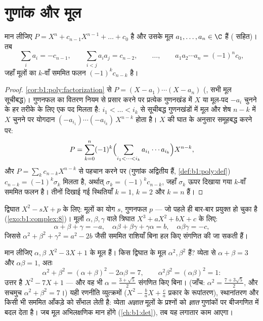 \section{गुणांक और मूल}

\begin{theorem}[व्येता के सूत्र]\label{thm:b1:poly:vieta}
मान लीजिए $P = X^n + c_{n-1} X^{n-1} + \dots + c_0$  है और उसके मूल
$a_1, \dots, a_n \in \C$ हैं ( सहित)। तब
\[
\sum_i a_i = -c_{n-1},
\qquad
\sum_{i < j} a_i a_j = c_{n-2},
\qquad \dots, \qquad
a_1 a_2 \cdots a_n = (-1)^n c_0 ,
\]
जहाँ मूलों का $k$-वाँ सममित फलन $(-1)^k c_{n-k}$ है।
\end{theorem}

\begin{proof}
\cref{cor:b1:poly:factorization} से $P = (X - a_1)\cdots(X - a_n)$
(, सभी मूल सूचीबद्ध)। गुणनफल का वितरण नियम से प्रसार करने पर
प्रत्येक गुणनखंड में $X$ या मूल-पद $-a_i$ चुनने के हर तरीके के लिए एक पद
मिलता है: $i_1 < \dots < i_k$ से सूचीबद्ध गुणनखंडों में मूल और शेष $n - k$
में $X$ चुनने पर योगदान $(-a_{i_1})\cdots(-a_{i_k})\,X^{n-k}$ होता है। $X$
की घात के अनुसार समूहबद्ध करने पर:
\[
P = \sum_{k=0}^{n} (-1)^k
\Bigl(\sum_{i_1 < \dots < i_k} a_{i_1}\cdots a_{i_k}\Bigr)
X^{n-k} ,
\]
और $P = \sum_k c_{n-k}X^{n-k}$ से पहचान करने पर (गुणांक अद्वितीय हैं,
\cref{def:b1:poly:def}) $c_{n-k} = (-1)^k \sigma_k$ मिलता है, अर्थात्
$\sigma_k = (-1)^kc_{n-k}$, जहाँ $\sigma_k$ ऊपर दिखाया गया $k$-वाँ सममित फलन
है। तीनों दिखाई गई स्थितियाँ $k = 1$, $k = 2$ और $k = n$ हैं।
\end{proof}

\begin{example}\label{ex:b1:poly:vieta}
द्विघात $X^2 - sX + p$ के लिए: मूलों का योग $s$, गुणनफल $p$ --- जो पहले ही
बार-बार प्रयुक्त हो चुका है (\cref{exo:b1:complex:8})। मूलों $\alpha, \beta,
\gamma$ वाले  त्रिघात $X^3 + aX^2 + bX + c$ के लिए:
\[
\alpha + \beta + \gamma = -a,
\quad
\alpha\beta + \beta\gamma + \gamma\alpha = b,
\quad
\alpha\beta\gamma = -c ,
\]
जिससे $\alpha^2 + \beta^2 + \gamma^2 = a^2 - 2b$ जैसी सममित राशियाँ बिना हल
किए संगणित की जा सकती हैं।
\end{example}

\begin{example}\label{ex:b1:poly:transformroots}
मान लीजिए $\alpha, \beta$ $X^2 - 3X + 1$ के मूल हैं। किस  द्विघात
के मूल $\alpha^2, \beta^2$ हैं? व्येता से $\alpha + \beta = 3$ और
$\alpha\beta = 1$, अतः
\[
\alpha^2 + \beta^2 = (\alpha+\beta)^2 - 2\alpha\beta = 7,
\qquad
\alpha^2\beta^2 = (\alpha\beta)^2 = 1 :
\]
उत्तर है $X^2 - 7X + 1$ --- और वह भी $\alpha = \frac{3 + \sqrt5}2$ संगणित
किए बिना। (जाँच: $\alpha^2 = \frac{7 + 3\sqrt5}2$, और सचमुच $\alpha^2 +
\beta^2 = 7$।) यही रणनीति व्युत्क्रमों ($X^2 - \frac ba X + \frac ca$ प्रकार
के रूपांतरण), स्थानांतरण और किसी भी सममित आँकड़े को सँभाल लेती है: व्येता
\emph{अज्ञात} मूलों के प्रश्नों को \emph{ज्ञात} गुणांकों पर बीजगणित में बदल
देता है। जब मूल अभिलक्षणिक मान होंगे (\cref{ch:b1:det}), तब यह लगातार काम
आएगा।
\end{example}

